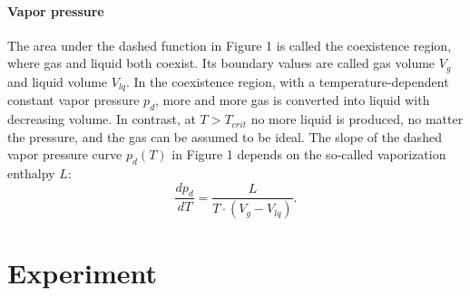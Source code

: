 \documentclass[10pt,a4paper]{article}
\begin{document}
\paragraph{Vapor pressure}
The area under the dashed function in Figure 1 is called the coexistence region, where gas and liquid both coexist. Its boundary values are called gas volume $V_g$ and liquid volume $V_{lq}$. In the coexistence region, with a temperature-dependent constant vapor pressure $p_d$, more and more gas is converted into liquid with decreasing volume. In contrast, at $T > T_{crit}$ no more liquid is produced, no matter the pressure, and the gas can be assumed to be ideal. The slope of the dashed vapor pressure curve $p_{d}(T)$ in Figure 1 depends on the so-called vaporization enthalpy $L$:
\begin{equation}
    \frac{dp_d}{dT} = \frac{L}{T \cdot (V_g - V_{lq})}.
\end{equation}
\section{Experiment}
\end{document}
